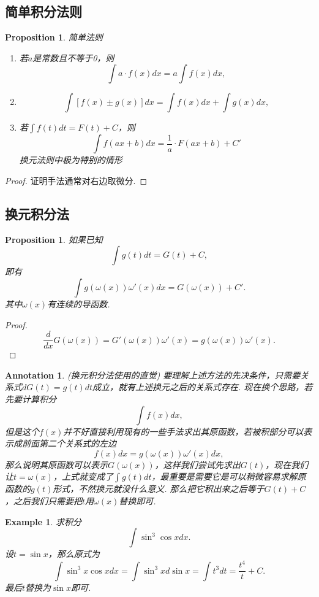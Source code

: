 \documentclass{article}
\newtheorem{proposition}[theorem]{Proposition}
\newtheorem{example}[theorem]{Example}
\newtheorem{annotation}[theorem]{Annotation}
\begin{document}
\subsection{简单积分法则}

\begin{proposition}
\rm 简单法则
\begin{enumerate}
	\item 若$a$是常数且不等于0，则
	$$
	\int a\cdot f(x)dx = a \int f(x)dx,
	$$
	\item 
	$$
	\int \left[ f(x) \pm  g(x) \right]dx = \int f(x)dx + \int g(x)dx,
	$$
	\item 若$\int f(t)dt = F(t)+C$，则
	$$
	\int f(ax+b)dx = \frac{1}{a}\cdot F(ax+b)+C'
	$$
	{\color{red} 换元法则中极为特别的情形}
\end{enumerate}
\end{proposition}

\begin{proof}
{\color{blue}证明手法通常对右边取微分}.
\end{proof}


\subsection{换元积分法}
\begin{proposition}
\rm 如果已知
$$
\int g(t)dt = G(t)+C,
$$
即有
$$
\int g(\omega(x))\omega'(x)dx = G(\omega(x)) + C'.
$$
其中$\omega(x)$有连续的导函数. 
\end{proposition}

\begin{proof}
$$
\frac{d}{dx}G(\omega(x)) = G'(\omega(x))\omega'(x) = g(\omega(x))\omega'(x).
$$
\end{proof}

\begin{annotation}
\rm {\color{red} (换元积分法使用的直觉)} 要理解上述方法的先决条件，只需要关系式$dG(t)=g(t)dt$成立，就有上述换元之后的关系式存在. 现在换个思路，若先要计算积分
$$
\int f(x)dx,
$$
但是这个$f(x)$并不好直接利用现有的一些手法求出其原函数，若被积部分可以表示成前面第二个关系式的左边
$$
f(x)dx = g(\omega(x))\omega'(x)dx,
$$
那么说明其原函数可以表示$G(\omega(x))$，这样我们尝试先求出$G(t)$，现在我们让$t=\omega(x)$，上式就变成了$\int g(t)dt$，{\color{blue}最重要是需要它是可以稍微容易求解原函数的$g(t)$形式，不然换元就没什么意义}. 那么把它积出来之后等于$G(t)+C$，之后我们只需要把$t$用$\omega(x)$替换即可.
\end{annotation}

\begin{example}
\rm 求积分
$$
\int \sin^3\cos xdx.
$$
设$t=\sin x$，那么原式为
$$
\int \sin^3x\cos xdx = \int \sin^3xd\sin x = \int t^3 dt = \frac{t^4}{t}+C.
$$
最后$t$替换为$\sin x$即可.
\end{example}
\end{document}
